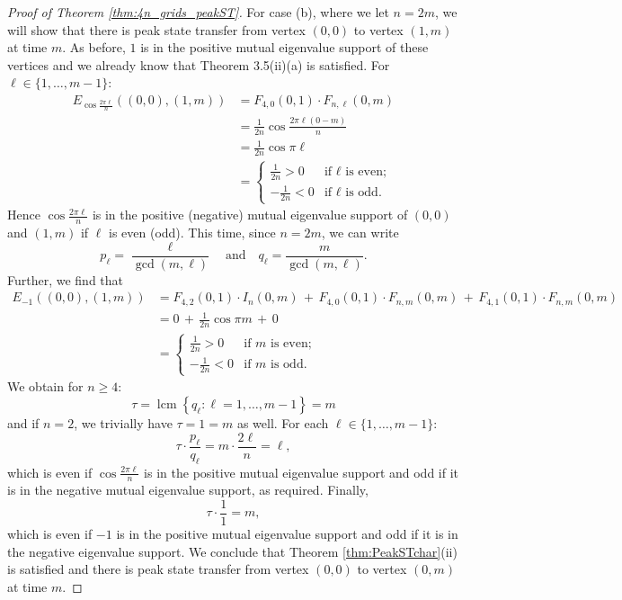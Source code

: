 \documentclass{article}
\numberwithin{equation}{section}
\DeclareMathOperator{\lcm}{lcm}
\begin{document}
\begin{proof}[Proof of Theorem \ref{thm:4n_grids_peakST}]
For case (b), where we let $n = 2m$, we will show that there is peak state transfer from vertex $(0,0)$ to vertex $(1,m)$ at time $m$. As before, $1$ is in the positive mutual eigenvalue support of these vertices and we already know that Theorem 3.5(ii)(a) is satisfied. For $\ell \in \{1,\ldots,m -1\}$:
\begin{align*}
E_{\cos\frac{2\pi \ell}{n}}((0,0),(1,m)) &= F_{4,0}(0,1)\cdot F_{n,\ell}(0,m)\\
&= \frac{1}{2n}\cos\frac{2\pi\ell(0 - m)}{n} \\
&= \frac{1}{2n} \cos\pi\ell \\
&= \begin{cases}
\frac{1}{2n} > 0 &\text{if $\ell$ is even;} \\
-\frac{1}{2n} < 0 &\text{if $\ell$ is odd.}
\end{cases}
\end{align*}
Hence $\cos\frac{2\pi\ell}{n}$ is in the positive (negative) mutual eigenvalue support of $(0,0)$ and $(1,m)$ if $\ell$ is even (odd). This time, since $n = 2m$, we can write
\[
p_\ell = \frac{\ell}{\gcd(m,\ell)} \quad \text{and} \quad q_\ell = \frac{m}{\gcd(m,\ell)}.
\]
Further, we find that
\begin{align*}
E_{-1}((0,0),(1,m)) &= F_{4,2}(0,1) \cdot I_n(0,m) \,+\, F_{4,0}(0,1) \cdot F_{n,m}(0,m) \,+\, F_{4,1}(0,1)\cdot F_{n,m}(0,m) \\
&= 0 \,+\, \frac{1}{2n}\cos\pi m \,+\, 0 \\
&= \begin{cases}
\frac{1}{2n} > 0 &\text{if $m$ is even;} \\
-\frac{1}{2n} < 0 &\text{if $m$ is odd.}
\end{cases}
\end{align*}
We obtain for $n \geq 4$:
\[
\tau = \lcm\left\{q_\ell : \ell = 1,\ldots,m-1\right\} = m
\]
and if $n=2$, we trivially have $\tau = 1 = m$ as well. For each $\ell \in \{1,\ldots,m -1\}$:
\[
\tau \cdot \frac{p_\ell}{q_\ell} = m \cdot \frac{2\ell}{n} = \ell,
\]
which is even if $\cos\frac{2\pi \ell}{n}$ is in the positive mutual eigenvalue support and odd if it is in the negative mutual eigenvalue support, as required. Finally,
\[
\tau \cdot \frac{1}{1} = m,
\]
which is even if $-1$ is in the positive mutual eigenvalue support and odd if it is in the negative eigenvalue support. We conclude that Theorem \ref{thm:PeakSTchar}(ii) is satisfied and there is peak state transfer from vertex $(0,0)$ to vertex $(0,m)$ at time $m$.


\end{proof}
\end{document}
